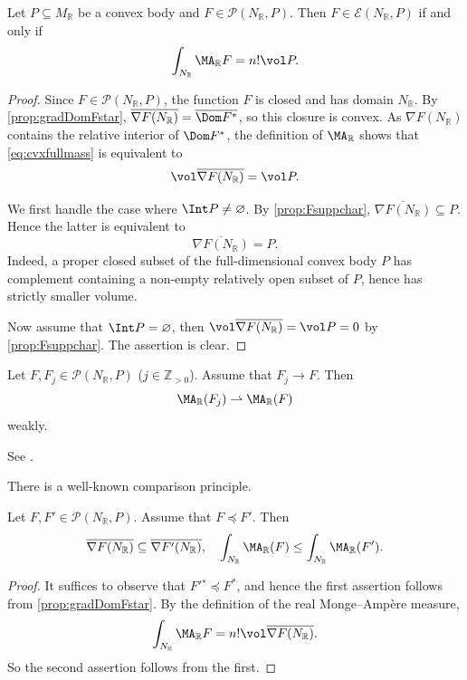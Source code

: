 \begin{proposition}\label{prop:convex:L541}
    Let $P\subseteq M_{\mathbb{R}}$ be a convex body and $F\in \mathcal{P}(N_{\mathbb{R}},P)$. Then $F\in \mathcal{E}(N_{\mathbb{R}},P)$ if and only if
    \begin{equation}\label{eq:cvxfullmass}
    \int_{N_{\mathbb{R}}}\MA_{\mathbb{R}}F=n! \vol P.
    \end{equation}
\end{proposition}
\begin{proof}


   Since $F\in\mathcal{P}(N_{\mathbb{R}},P)$, the function $F$ is closed and has domain $N_{\mathbb{R}}$. By \cref{prop:gradDomFstar}, $\overline{\nabla F(N_{\mathbb{R}})}=\overline{\Dom F^*}$, so this closure is convex. As $\nabla F(N_{\mathbb{R}})$ contains the relative interior of $\Dom F^*$, the definition of $\MA_{\mathbb{R}}$ shows that \eqref{eq:cvxfullmass} is equivalent to
   \[
   \vol \overline{\nabla F(N_{\mathbb{R}})}=\vol P.
   \]

   We first handle the case where $\Int P\neq \varnothing$.
   By \cref{prop:Fsuppchar}, $\overline{\nabla F(N_{\mathbb{R}})}\subseteq P$. Hence the latter is equivalent to
   \[
   \overline{\nabla F(N_{\mathbb{R}})}=P.
   \]
   Indeed, a proper closed subset of the full-dimensional convex body $P$ has complement containing a non-empty relatively open subset of $P$, hence has strictly smaller volume.

   Now assume that $\Int P=\varnothing$, then $\vol \overline{\nabla F(N_{\mathbb{R}})}=\vol P=0$ by \cref{prop:Fsuppchar}. The assertion is clear.
\end{proof}


\begin{theorem}\label{thm:realMAcont}
    Let $F,F_j\in \mathcal{P}(N_{\mathbb{R}},P)$ ($j\in \mathbb{Z}_{>0}$). Assume that $F_j\to F$. Then
    \[
    \MA_{\mathbb{R}}(F_j)\rightharpoonup \MA_{\mathbb{R}}(F)
    \]
    weakly.
\end{theorem}
See \cite[Proposition~2.6]{Fig17}.

There is a well-known comparison principle.
\begin{theorem}\label{thm:convcomp}
    Let $F,F'\in \mathcal{P}(N_{\mathbb{R}},P)$. Assume that $F\preceq F'$. Then
    \[
    \overline{\nabla F(N_{\mathbb{R}})}\subseteq \overline{\nabla F'(N_{\mathbb{R}})},\quad
    \int_{N_{\mathbb{R}}} \MA_{\mathbb{R}}(F)\leq \int_{N_{\mathbb{R}}} \MA_{\mathbb{R}}(F').
    \]
\end{theorem}
\begin{proof}
    It suffices to observe that $F'{}^*\preceq F^*$, and hence the first assertion follows from \cref{prop:gradDomFstar}. By the definition of the real Monge--Ampère measure,
    \[
        \int_{N_{\mathbb R}}\MA_{\mathbb R}F=n!\vol\overline{\nabla F(N_{\mathbb R})}.
    \]
    So the second assertion follows from the first.
\end{proof}

